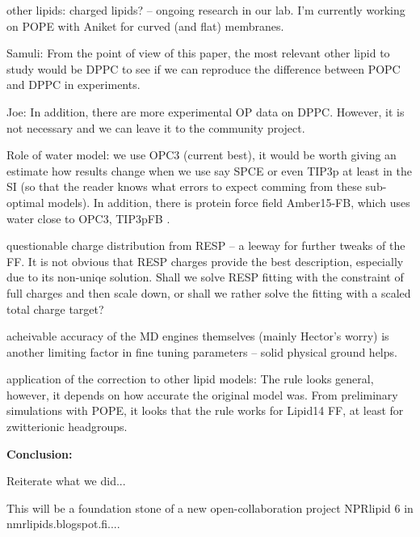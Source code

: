 \documentclass[aip,jcp,twocolumn]{revtex4}
\begin{document}
other lipids: charged lipids? -- ongoing research in our lab.
I'm currently working on POPE with Aniket for curved (and flat) membranes. 

Samuli: From the point of view of this paper, the most relevant other lipid to study would be DPPC to see if we can reproduce the difference between POPC and DPPC in experiments.

Joe: In addition, there are more experimental OP data on DPPC. However, it is not necessary and we can leave it to the community project. 

Role of water model: we use OPC3 (current best), it would be worth giving an estimate how results change when we use say SPCE or even TIP3p at least in the SI (so that the reader knows what errors to expect comming from these sub-optimal models). 
In addition, there is protein force field Amber15-FB, which uses water close to OPC3, TIP3pFB .

questionable charge distribution from RESP -- a leeway for further tweaks of the FF.
It is not obvious that RESP charges provide the best description, especially due to its non-uniqe solution. 
Shall we solve RESP fitting with the constraint of full charges and then scale down, or shall we rather solve the fitting with a scaled total charge target?

acheivable accuracy of the MD engines themselves (mainly Hector's worry) is another limiting factor in fine tuning parameters -- solid physical ground helps.

application of the correction to other lipid models: The rule looks general, however, it depends on how accurate the original model was.
From preliminary simulations with POPE, it looks that the rule works for Lipid14 FF, at least for zwitterionic headgroups.

\textbf{Conclusion:}

Reiterate what we did...

This will be a foundation stone of a new open-collaboration project NPRlipid 6 in nmrlipids.blogspot.fi....
















%
\end{document}
